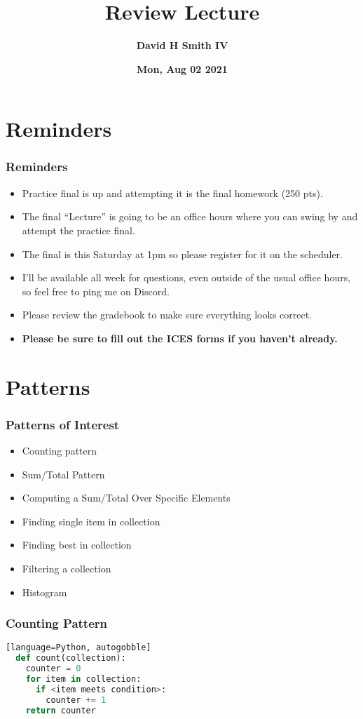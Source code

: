 \documentclass{beamer}
\title{\textbf{Review Lecture}}
\author{\textbf{David H Smith IV}}
\institute[\textbf{UIUC}]{\textbf{University of Illinois Urbana-Champaign}}
\date{\textbf{Mon, Aug 02 2021}}
\begin{document}
\frame{\titlepage}

\section{Reminders}

%
%
\begin{frame}
  \frametitle{Reminders}
  \begin{itemize}
    \item Practice final is up and attempting it is the final homework (250 pts).
    \item The final ``Lecture'' is going to be an office hours where you can swing by and attempt the practice final.
    \item The final is this Saturday at 1pm so please register for it on the scheduler.
    \item I'll be available all week for questions, even outside of the usual office hours, so feel free to ping me on Discord.
    \item Please review the gradebook to make sure everything looks correct.
    \item \textbf{Please be sure to fill out the ICES forms if you haven't already.}
  \end{itemize}
\end{frame}

\section{Patterns}

\begin{frame}
  \frametitle{Patterns of Interest}
  \begin{itemize}
    \item Counting pattern
    \item Sum/Total Pattern
    \item Computing a Sum/Total Over Specific Elements
    \item Finding single item in collection
    \item Finding best in collection
    \item Filtering a collection
    \item Histogram
  \end{itemize}
\end{frame}

%
%
\begin{frame}[fragile]
  \frametitle{Counting Pattern}
  \begin{lstlisting}[language=Python, autogobble][language=Python, autogobble]
  def count(collection):
    counter = 0
    for item in collection:
      if <item meets condition>:
        counter += 1
    return counter
  \end{lstlisting}
\end{frame}
\end{document}
